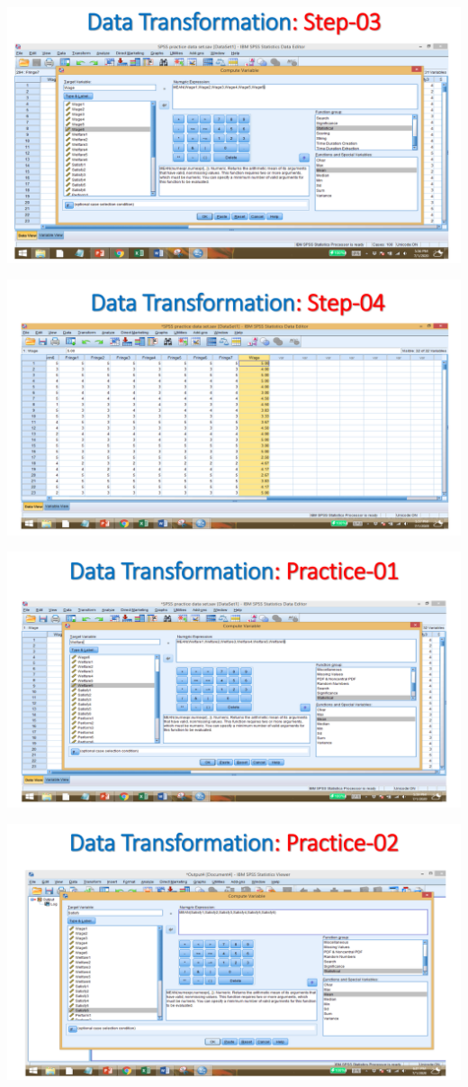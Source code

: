 \documentclass[
  letterpaper,
  DIV=11,
  numbers=noendperiod]{scrreprt}
\begin{document}
\includegraphics{images/slides/img_Page_018.png}

\includegraphics{images/slides/img_Page_019.png}

\includegraphics{images/slides/img_Page_020.png}

\includegraphics{images/slides/img_Page_021.png}
\end{document}
